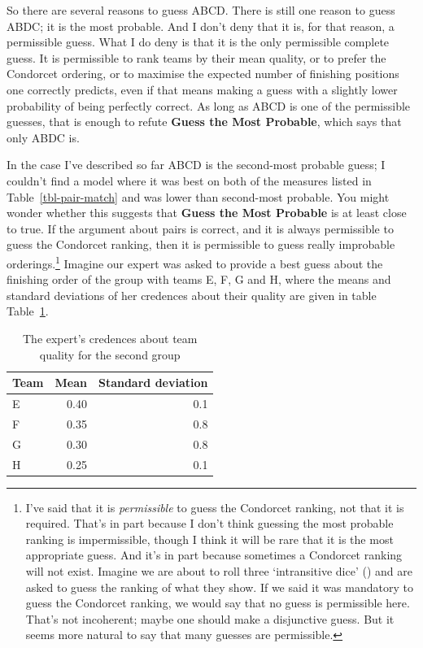 \documentclass[
  11pt,
  letterpaper,
  DIV=11,
  numbers=noendperiod,
  twoside]{scrartcl}
\begin{document}
So there are several reasons to guess ABCD. There is still one reason to
guess ABDC; it is the most probable. And I don't deny that it is, for
that reason, a permissible guess. What I do deny is that it is the only
permissible complete guess. It is permissible to rank teams by their
mean quality, or to prefer the Condorcet ordering, or to maximise the
expected number of finishing positions one correctly predicts, even if
that means making a guess with a slightly lower probability of being
perfectly correct. As long as ABCD is one of the permissible guesses,
that is enough to refute \textbf{Guess the Most Probable}, which says
that only ABDC is.

In the case I've described so far ABCD is the second-most probable
guess; I couldn't find a model where it was best on both of the measures
listed in Table~\ref{tbl-pair-match} and was lower than second-most
probable. You might wonder whether this suggests that \textbf{Guess the
Most Probable} is at least close to true. If the argument about pairs is
correct, and it is always permissible to guess the Condorcet ranking,
then it is permissible to guess really improbable orderings.\footnote{I've
  said that it is \emph{permissible} to guess the Condorcet ranking, not
  that it is required. That's in part because I don't think guessing the
  most probable ranking is impermissible, though I think it will be rare
  that it is the most appropriate guess. And it's in part because
  sometimes a Condorcet ranking will not exist. Imagine we are about to
  roll three `intransitive dice' () and are asked to guess the ranking of what they show. If we
  said it was mandatory to guess the Condorcet ranking, we would say
  that no guess is permissible here. That's not incoherent; maybe one
  should make a disjunctive guess. But it seems more natural to say that
  many guesses are permissible.} Imagine our expert was asked to provide
a best guess about the finishing order of the group with teams E, F, G
and H, where the means and standard deviations of her credences about
their quality are given in table Table~\ref{tbl-high-variance}.

{

\begin{longtable}[]{@{}lrr@{}}

\caption{\label{tbl-high-variance}The expert's credences about team
quality for the second group}

\tabularnewline

\toprule\noalign{}
Team & Mean & Standard deviation \\
\midrule\noalign{}
\endhead
\bottomrule\noalign{}
\endlastfoot
E & 0.40 & 0.1 \\
F & 0.35 & 0.8 \\
G & 0.30 & 0.8 \\
H & 0.25 & 0.1 \\

\end{longtable}

}
\end{document}
